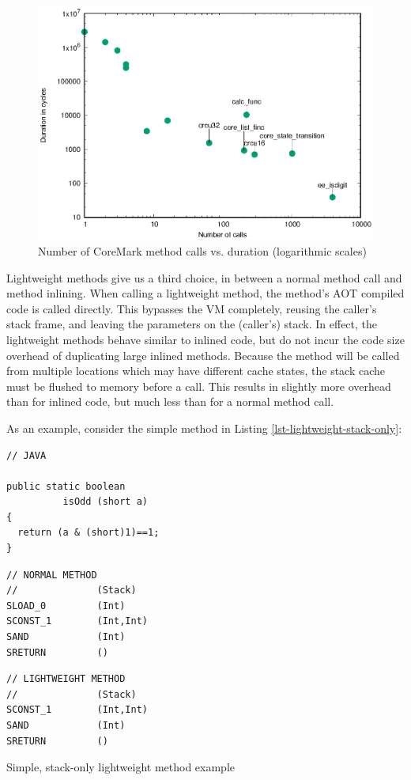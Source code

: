 \begin{figure}
\centering
\includegraphics[width=.5\linewidth]{method-calls-vs-duration.eps}
\caption[Number of CoreMark method calls vs. duration]{Number of CoreMark method calls vs. duration (logarithmic scales)}
\label{fig-coremark-method-calls-vs-duration}
\end{figure}

Lightweight methods give us a third choice, in between a normal method call and method inlining. When calling a lightweight method, the method's AOT compiled code is called directly. This bypasses the VM completely, reusing the caller's stack frame, and leaving the parameters on the (caller's) stack. In effect, the lightweight methods behave similar to inlined code, but do not incur the code size overhead of duplicating large inlined methods. Because the method will be called from multiple locations which may have different cache states, the stack cache must be flushed to memory before a call. This results in slightly more overhead than for inlined code, but much less than for a normal method call.

As an example, consider the simple  method in Listing \ref{lst-lightweight-stack-only}:

\begin{listing}
\centering
\begin{minipage}[t]{0.32\textwidth}
\centering
\begin{verbatim}
// JAVA

public static boolean
          isOdd (short a)
{
  return (a & (short)1)==1;
}
\end{verbatim}
\end{minipage}\hfill
\begin{minipage}[t]{0.29\textwidth}
\centering
\begin{verbatim}
// NORMAL METHOD
//              (Stack)
SLOAD_0         (Int)
SCONST_1        (Int,Int)
SAND            (Int)
SRETURN         ()
\end{verbatim}
\end{minipage}\hfill
\begin{minipage}[t]{0.29\textwidth}
\centering
\begin{verbatim}
// LIGHTWEIGHT METHOD
//              (Stack)
SCONST_1        (Int,Int)
SAND            (Int)
SRETURN         ()
\end{verbatim}
\end{minipage}
\caption{Simple, stack-only lightweight method example}
\label{lst-lightweight-stack-only}
\end{listing}

